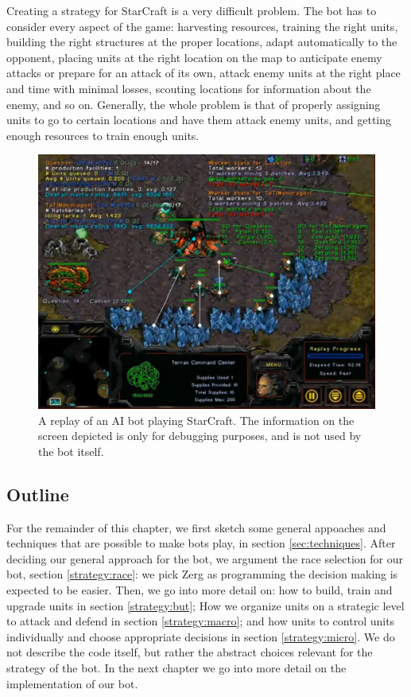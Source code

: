 Creating a strategy for StarCraft is a very difficult problem. The bot has to consider every aspect of the game: harvesting resources, training the right units, building the right structures at the proper locations, adapt automatically to the opponent, placing units at the right location on the map to anticipate enemy attacks or prepare for an attack of its own, attack enemy units at the right place and time with minimal losses, scouting locations for information about the enemy, and so on. Generally, the whole problem is that of properly assigning units to go to certain locations and have them attack enemy units, and getting enough resources to train enough units.

\begin{figure}
\centering
\includegraphics[scale=0.6]{bwapi.jpg}
\caption{\label{fig:bwapi} A replay of an AI bot playing StarCraft. The information on the screen depicted is only for debugging purposes, and is not used by the bot itself.}
\end{figure}



\subsection*{Outline}
For the remainder of this chapter, we first sketch some general appoaches and techniques that are possible to make bots play, in section \ref{sec:techniques}. After deciding our general approach for the bot, we argument the race selection for our bot, section \ref{strategy:race}: we pick Zerg as programming the decision making is expected to be easier. Then, we go into more detail on: how to build, train and upgrade units in section \ref{strategy:but}; How we organize units on a strategic level to attack and defend in section \ref{strategy:macro}; and how units to control units individually and choose appropriate decisions in section \ref{strategy:micro}. We do not describe the code itself, but rather the abstract choices relevant for the strategy of the bot. In the next chapter we go into more detail on the implementation of our bot.


